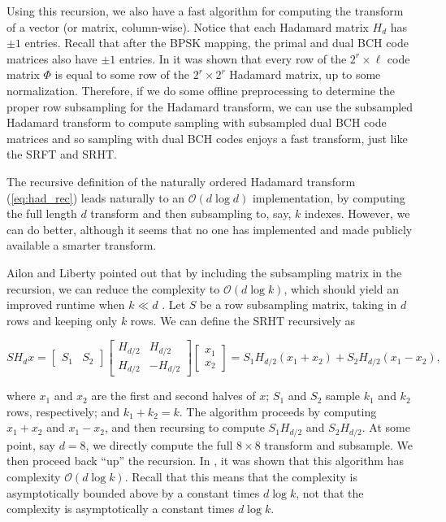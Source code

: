 \documentclass[12pt]{article}
\begin{document}
   \noindent Using this recursion, we also have a fast algorithm for computing the transform of a vector (or matrix, column-wise).  Notice that each Hadamard matrix $H_d$ has $\pm 1$ entries.  Recall that after the BPSK mapping, the primal and dual BCH code matrices also have $\pm 1$ entries.  In \cite{ailon2009fast} it was shown that every row of the $2^r\times \ell$ code matrix $\Phi$ is equal to some row of the $2^r\times 2^r$ Hadamard matrix, up to some normalization.  Therefore, if we do some offline preprocessing to determine the proper row subsampling for the Hadamard transform, we can use the subsampled Hadamard transform to compute sampling with subsampled dual BCH code matrices and so sampling with dual BCH codes enjoys a fast transform, just like the SRFT and SRHT.

   The recursive definition of the naturally ordered Hadamard transform (\ref{eq:had_rec}) leads naturally to an $\mathcal{O}(d\log d)$ implementation, by computing the full length $d$ transform and then subsampling to, say, $k$ indexes.  However, we can do better, although it seems that no one has implemented and made publicly available a smarter transform.
   
   Ailon and Liberty pointed out that by including the subsampling matrix in the recursion, we can reduce the complexity to $\mathcal{O}(d\log k)$, which should yield an improved runtime when $k\ll d$ \cite{ailon2009fast}.  Let $S$ be a row subsampling matrix, taking in $d$ rows and keeping only $k$ rows.  We can define the SRHT recursively as 

   \begin{equation}
      \label{eq:srht_rec}
      SH_dx = \begin{bmatrix} S_1 & S_2\end{bmatrix}\begin{bmatrix} H_{d/2} & H_{d/2}\\H_{d/2}&-H_{d/2}\end{bmatrix} \begin{bmatrix}x_1\\x_2\end{bmatrix} = S_1 H_{d/2}(x_1+x_2) + S_2H_{d/2}(x_1-x_2),
   \end{equation}

   \noindent where $x_1$ and $x_2$ are the first and second halves of $x$; $S_1$ and $S_2$ sample $k_1$ and $k_2$ rows, respectively; and $k_1+k_2=k$.  The algorithm proceeds by computing $x_1+x_2$ and $x_1-x_2$, and then recursing to compute $S_1H_{d/2}$ and $S_2H_{d/2}$.  At some point, say $d=8$, we directly compute the full $8\times 8$ transform and subsample.  We then proceed back ``up'' the recursion.  In \cite{ailon2009fast}, it was shown that this algorithm has complexity $\mathcal{O}(d\log k)$.  Recall that this means that the complexity is asymptotically bounded above by a constant times $d\log k$, not that the complexity is asymptotically a constant times $d\log k$.
\end{document}
